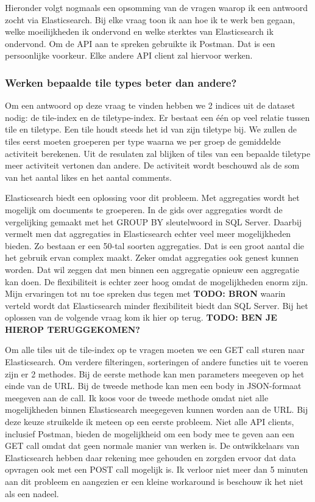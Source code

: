 Hieronder volgt nogmaals een opsomming van de vragen waarop ik een antwoord zocht via Elasticsearch. Bij elke vraag toon ik aan hoe ik te werk ben gegaan, welke moeilijkheden ik ondervond en welke sterktes van Elasticsearch ik ondervond. Om de API aan te spreken gebruikte ik Postman. Dat is een persoonlijke voorkeur. Elke andere API client zal hiervoor werken.

\subsubsection{Werken bepaalde tile types beter dan andere?}
Om een antwoord op deze vraag te vinden hebben we 2 indices uit de dataset nodig: de tile-index en de tiletype-index. Er bestaat een één op veel relatie tussen tile en tiletype. Een tile houdt steeds het id van zijn tiletype bij. We zullen de tiles eerst moeten groeperen per type waarna we per groep de gemiddelde activiteit berekenen. Uit de resulaten zal blijken of tiles van een bepaalde tiletype meer activiteit vertonen dan andere. De activiteit wordt beschouwd als de som van het aantal likes en het aantal comments.

Elasticsearch biedt een oplossing voor dit probleem. Met aggregaties wordt het mogelijk om documents te groeperen. In de gids over aggregaties wordt de vergelijking gemaakt met het GROUP BY sleutelwoord in SQL Server. Daarbij vermelt men dat aggregaties in Elasticsearch echter veel meer mogelijkheden bieden. Zo bestaan er een 50-tal soorten aggregaties. Dat is een groot aantal die het gebruik ervan complex maakt. Zeker omdat aggregaties ook genest kunnen worden. Dat wil zeggen dat men binnen een aggregatie opnieuw een aggregatie kan doen. De flexibiliteit is echter zeer hoog omdat de mogelijkheden enorm zijn. Mijn ervaringen tot nu toe spreken dus tegen met \textbf{TODO: BRON} waarin verteld wordt dat Elasticsearch minder flexibiliteit biedt dan SQL Server. Bij het oplossen van de volgende vraag kom ik hier op terug. \textbf{TODO: BEN JE HIEROP TERUGGEKOMEN?}

Om alle tiles uit de tile-index op te vragen moeten we een GET call sturen naar Elasticsearch. Om verdere filteringen, sorteringen of andere functies uit te voeren zijn er 2 methodes. Bij de eerste methode kan men parameters meegeven op het einde van de URL. Bij de tweede methode kan men een body in JSON-formaat meegeven aan de call. Ik koos voor de tweede methode omdat niet alle mogelijkheden binnen Elasticsearch meegegeven kunnen worden aan de URL. Bij deze keuze struikelde ik meteen op een eerste probleem. Niet alle API clients, inclusief Postman, bieden de mogelijkheid om een body mee te geven aan een GET call omdat dat geen normale manier van werken is. De ontwikkelaars van Elasticsearch hebben daar rekening mee gehouden en zorgden ervoor dat data opvragen ook met een POST call mogelijk is. Ik verloor niet meer dan 5 minuten aan dit probleem en aangezien er een kleine workaround is beschouw ik het niet als een nadeel.

